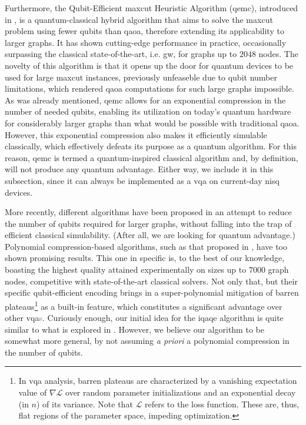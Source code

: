 Furthermore, the Qubit-Efficient \acrshort{maxcut} Heuristic Algorithm (\acrshort{qemc}), introduced in \cite{tenecohen2023variational}, is a quantum-classical hybrid algorithm that aims to solve the \acrshort{maxcut} problem using fewer qubits than \acrshort{qaoa}, therefore extending its applicability to larger graphs. It has shown cutting-edge performance in practice, occasionally surpassing the classical state-of-the-art, i.e. \acrshort{gw}, for graphs up to $2048$ nodes. The novelty of this algorithm is that it opens up the door for quantum devices to be used for large \acrshort{maxcut} instances, previously unfeaseble due to qubit number limitations, which rendered \acrshort{qaoa} computations for such large graphs impossible. As was already mentioned, \acrshort{qemc} allows for an exponential compression in the number of needed qubits, enabling its utilization on today's quantum hardware for considerably larger graphs than what would be possible with traditional \acrshort{qaoa}. However, this exponential compression also makes it efficiently simulable classically, which effectively defeats its purpose as a quantum algorithm. For this reason, \acrshort{qemc} is termed a quantum-inspired classical algorithm and, by definition, will not produce any quantum advantage. Either way, we include it in this subsection, since it can always be implemented as a \acrshort{vqa} on current-day \acrshort{nisq} devices.

More recently, different algorithms have been proposed in an attempt to reduce the number of qubits required for larger graphs, without falling into the trap of efficient classical simulability. (After all, we are looking for quantum advantage.) Polynomial compression-based algorithms, such as that proposed in \cite{sciorilli2024largescale}, have too shown promising results. This one in specific \cite{sciorilli2024largescale} is, to the best of our knowledge, boasting the highest quality attained experimentally on sizes up to $7000$ graph nodes, competitive with state-of-the-art classical solvers. Not only that, but their specific qubit-efficient encoding brings in a super-polynomial mitigation of barren plateaus\footnote{In \acrshort{vqa} analysis, barren plateaus are characterized by a vanishing expectation value of $\nabla{\mathcal{L}}$ over random parameter initializations and an exponential decay (in $n$) of its variance. Note that $\mathcal{L}$ refers to the loss function. These are, thus, flat regions of the parameter space, impeding optimization.} as a built-in feature, which constitutes a significant advantage over other \acrshort{vqa}\textcolor{gray}{s}. Curiously enough, our initial idea for the \acrshort{iqaqe} algorithm is quite similar to what is explored in \cite{sciorilli2024largescale}. However, we believe our algorithm to be somewhat more general, by not assuming \textit{a priori} a polynomial compression in the number of qubits.

